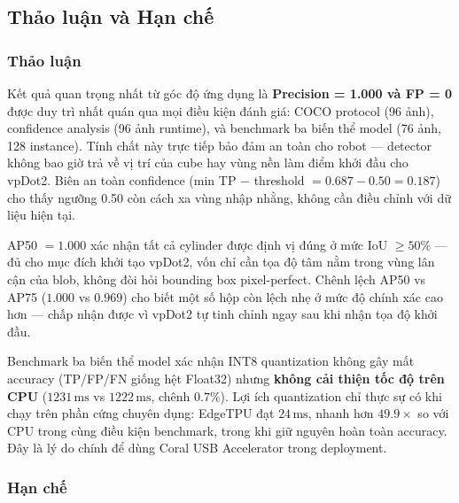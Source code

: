 
\subsection{Thảo luận và Hạn chế}
\label{subsec:ai3-disc}

\subsubsection*{Thảo luận}

Kết quả quan trọng nhất từ góc độ ứng dụng là \textbf{Precision =
1.000 và FP = 0} được duy trì nhất quán qua mọi điều kiện đánh
giá: COCO protocol (96 ảnh), confidence analysis (96 ảnh runtime),
và benchmark ba biến thể model (76 ảnh, 128 instance). Tính chất
này trực tiếp bảo đảm an toàn cho robot --- detector không bao
giờ trả về vị trí của cube hay vùng nền làm điểm khởi đầu cho
vpDot2. Biên an toàn confidence (min TP $-$ threshold $= 0.687
- 0.50 = 0.187$) cho thấy ngưỡng 0.50 còn cách xa vùng nhập
nhằng, không cần điều chỉnh với dữ liệu hiện tại.

AP50 $= 1.000$ xác nhận tất cả cylinder được định vị đúng ở mức
IoU $\geq 50\%$ --- đủ cho mục đích khởi tạo vpDot2, vốn chỉ cần
tọa độ tâm nằm trong vùng lân cận của blob, không đòi hỏi
bounding box pixel-perfect. Chênh lệch AP50 vs AP75 ($1.000$
vs $0.969$) cho biết một số hộp còn lệch nhẹ ở mức độ chính xác
cao hơn --- chấp nhận được vì vpDot2 tự tinh chỉnh ngay sau khi
nhận tọa độ khởi đầu.

Benchmark ba biến thể model xác nhận INT8 quantization không
gây mất accuracy (TP/FP/FN giống hệt Float32) nhưng \textbf{không
cải thiện tốc độ trên CPU} ($1231\,\text{ms}$ vs $1222\,\text{ms}$,
chênh $0.7\%$). Lợi ích quantization chỉ thực sự có khi chạy
trên phần cứng chuyên dụng: EdgeTPU đạt $24\,\text{ms}$, nhanh
hơn $49.9\times$ so với CPU trong cùng điều kiện benchmark, trong
khi giữ nguyên hoàn toàn accuracy. Đây là lý do chính để dùng
Coral USB Accelerator trong deployment.

\subsubsection*{Hạn chế}

